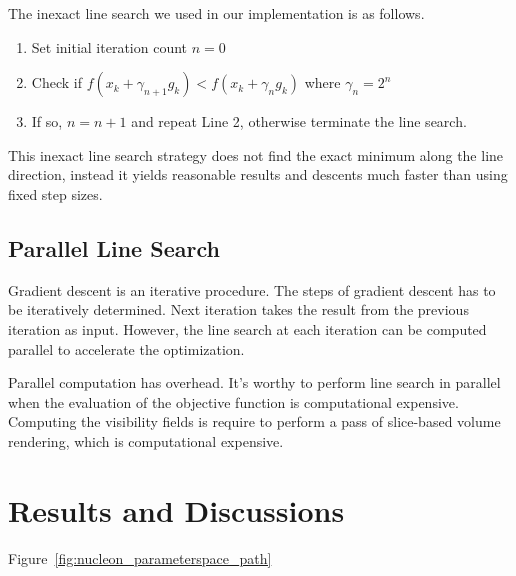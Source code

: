 The inexact line search we used in our implementation is as follows.

\begin{enumerate}
	\item Set initial iteration count $ n=0 $
	\item Check if $ f(x_{k}+\gamma_{n+1} g_{k}) < f(x_{k}+\gamma_{n} g_{k}) $ where $ \gamma_{n}=2^{n} $
	\item If so, $ n=n+1 $ and repeat Line 2, otherwise terminate the line search.
\end{enumerate}

This inexact line search strategy does not find the exact minimum along the line direction, instead it yields reasonable results and descents much faster than using fixed step sizes.

\subsection{Parallel Line Search}
Gradient descent is an iterative procedure.
The steps of gradient descent has to be iteratively determined. Next iteration takes the result from the previous iteration as input.
However, the line search at each iteration can be computed parallel to accelerate the optimization.



Parallel computation has overhead.
It's worthy to perform line search in parallel when the evaluation of the objective function is computational expensive.
Computing the visibility fields is require to perform a pass of slice-based volume rendering, which is computational expensive.

\section{Results and Discussions}

Figure~\ref{fig:nucleon_parameterspace_path}

